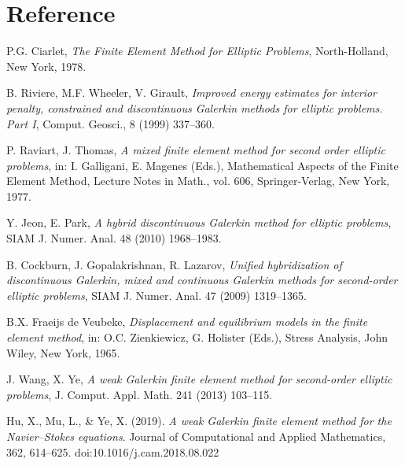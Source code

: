 \documentclass[12pt]{article} %
\begin{document}
\section{Reference}
\begin{thebibliography}{99}

    P.G. Ciarlet, \emph{The Finite Element Method for Elliptic Problems}, North-Holland, New York, 1978.
    
    B. Riviere, M.F. Wheeler, V. Girault, \emph{Improved energy estimates for interior penalty, constrained and discontinuous Galerkin methods for elliptic problems. Part I}, Comput. Geosci., 8 (1999) 337--360.
    
    P. Raviart, J. Thomas, \emph{A mixed finite element method for second order elliptic problems}, in: I. Galligani, E. Magenes (Eds.), Mathematical Aspects of the Finite Element Method, Lecture Notes in Math., vol. 606, Springer-Verlag, New York, 1977.
    
    Y. Jeon, E. Park, \emph{A hybrid discontinuous Galerkin method for elliptic problems}, SIAM J. Numer. Anal. 48 (2010) 1968--1983.
    
    B. Cockburn, J. Gopalakrishnan, R. Lazarov, \emph{Unified hybridization of discontinuous Galerkin, mixed and continuous Galerkin methods for second-order elliptic problems}, SIAM J. Numer. Anal. 47 (2009) 1319--1365.

    B.X. Fraeijs de Veubeke, \emph{Displacement and equilibrium models in the finite element method}, in: O.C. Zienkiewicz, G. Holister (Eds.), Stress Analysis, John Wiley, New York, 1965.
    
    J. Wang, X. Ye, \emph{A weak Galerkin finite element method for second-order elliptic problems}, J. Comput. Appl. Math. 241 (2013) 103--115.
    
    Hu, X., Mu, L., \& Ye, X. (2019). \emph{A weak Galerkin finite element method for the Navier–Stokes equations}. Journal of Computational and Applied Mathematics, 362, 614--625. doi:10.1016/j.cam.2018.08.022
    
    \end{thebibliography}
\end{document}
